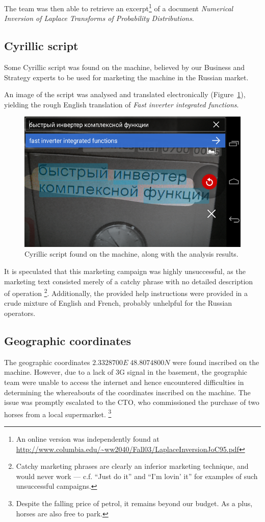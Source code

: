 The team was then able to retrieve an excerpt\footnote{An online version was independently found at \url{http://www.columbia.edu/~ww2040/Fall03/LaplaceInversionJoC95.pdf}} of a document \emph{Numerical Inversion of Laplace Transforms of Probability Distributions}.


\subsection{Cyrillic script}
Some Cyrillic script was found on the machine, believed by our Business and Strategy experts to be used for marketing the machine in the Russian market.

An image of the script was analysed and translated electronically (Figure~\ref{fig:cyrillic-script}), yielding the rough English translation of \emph{Fast inverter integrated functions}.

\begin{figure}[h]
	\centering
	\includegraphics[width=0.9\columnwidth]{img/cyrillic-script.png}
	\caption{Cyrillic script found on the machine, along with the analysis results.}
	\label{fig:cyrillic-script}
\end{figure}

It is speculated that this marketing campaign was highly unsuccessful, as the marketing text consisted merely of a catchy phrase with no detailed description of operation \footnote{Catchy marketing phrases are clearly an inferior marketing technique, and would never work --- c.f. ``Just do it'' and ``I'm lovin' it'' for examples of such unsuccessful campaigns.}. Additionally, the provided help instructions were provided in a crude mixture of English and French, probably unhelpful for the Russian operators.




\subsection{Geographic coordinates}
The geographic coordinates $2.3328700E \; 48.8074800N$ were found inscribed on the machine. However, due to a lack of 3G signal in the basement, the geographic team were unable to access the internet and hence encountered difficulties in determining the whereabouts of the coordinates inscribed on the machine. The issue was promptly escalated to the CTO, who commissioned the purchase of two horses from a local supermarket. \footnote{Despite the falling price of petrol, it remains beyond our budget. As a plus, horses are also free to park.}

